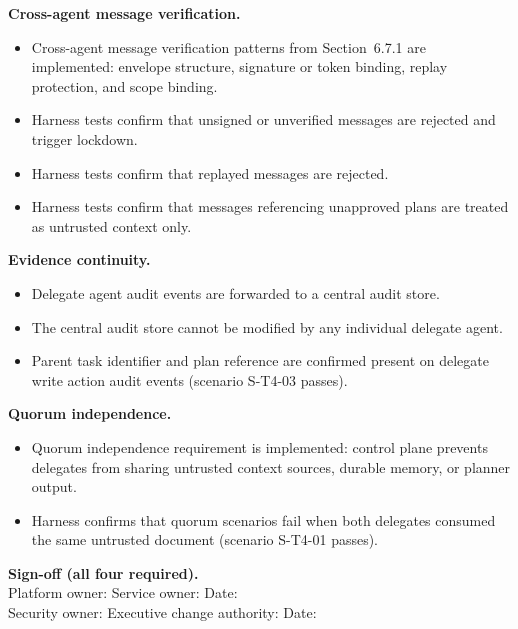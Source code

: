 \documentclass[11pt]{article}
\begin{document}
\textbf{Cross-agent message verification.}
\begin{itemize}
  \item Cross-agent message verification patterns from Section~6.7.1 are implemented: envelope structure, signature or token binding, replay protection, and scope binding.
  \item Harness tests confirm that unsigned or unverified messages are rejected and trigger lockdown.
  \item Harness tests confirm that replayed messages are rejected.
  \item Harness tests confirm that messages referencing unapproved plans are treated as untrusted context only.
\end{itemize}

\textbf{Evidence continuity.}
\begin{itemize}
  \item Delegate agent audit events are forwarded to a central audit store.
  \item The central audit store cannot be modified by any individual delegate agent.
  \item Parent task identifier and plan reference are confirmed present on delegate write action audit events (scenario S-T4-03 passes).
\end{itemize}

\textbf{Quorum independence.}
\begin{itemize}
  \item Quorum independence requirement is implemented: control plane prevents delegates from sharing untrusted context sources, durable memory, or planner output.
  \item Harness confirms that quorum scenarios fail when both delegates consumed the same untrusted document (scenario S-T4-01 passes).
\end{itemize}

\textbf{Sign-off (all four required).}\\
Platform owner: \underline{\hspace{1.5in}} \quad Service owner: \underline{\hspace{1.5in}} \quad Date: \underline{\hspace{0.7in}}\\[0.4em]
Security owner: \underline{\hspace{1.5in}} \quad Executive change authority: \underline{\hspace{1.5in}} \quad Date: \underline{\hspace{0.7in}}
\end{document}
